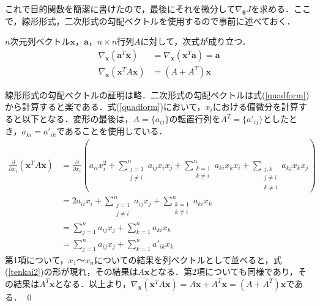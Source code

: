 これで目的関数を簡潔に書けたので，最後にそれを微分して$\nabla_{{\bm \theta}}J$を求める．ここで，線形形式，二次形式の勾配ベクトルを使用するので事前に述べておく．
\begin{theo}
$n$次元列ベクトル${\bm x}，{\bm a}$，$n\times n$行列$A$に対して，次式が成り立つ．
\begin{align}
\nabla_{{\bm x}}({\bm a}^T {\bm x})&=\nabla_{{\bm x}}({\bm x}^T {\bm a})={\bm a}\\
\nabla_{{\bm x}}({\bm x}^T A{\bm x})&=(A+A^T){\bm x}
\end{align}
\end{theo}
\begin{pro}
線形形式の勾配ベクトルの証明は略．二次形式の勾配ベクトルは式(\ref{quadform})から計算すると楽である．式(\ref{quadform})において，$x_i$における偏微分を計算すると以下となる．変形の最後は，$A=\{a_{ij}\}$の転置行列を$A^T=\{a'_{ij}\}$としたとき，$a_{ki}=a'_{ik}$であることを使用している．
\begin{align*}
\frac{\partial }{\partial x_i}({\bm x}^T A{\bm x})&=\frac{\partial }{\partial x_i}\left(a_{ii}x_i^2+\sum_{\substack{j=1\\j\neq i}}^n a_{ij}x_ix_j+\sum_{\substack{k=1\\k\neq i}}^n a_{ki}x_kx_i+\sum_{\substack{j,k\\j\neq i\\k\neq i}}a_{kj}x_kx_j\right) 	\\
&=2a_{ii}x_i+\sum_{\substack{j=1\\j\neq i}}^n a_{ij}x_j+\sum_{\substack{k=1\\k\neq i}}^n a_{ki}x_k\\
&=\sum_{j=1}^na_{ij}x_j+\sum_{k=1}^na_{ki}x_k\\
&=\sum_{j=1}^na_{ij}x_j+\sum_{k=1}^na'_{ik}x_k
\end{align*}
第1項について，$x_1〜x_n$についての結果を列ベクトルとして並べると，式(\ref{tenkai2})の形が現れ，その結果は$A{\bm x}$となる．第2項についても同様であり，その結果は$A^T{\bm x}$となる．以上より，$\nabla_{{\bm x}}({\bm x}^T A{\bm x})=A{\bm x}+A^T{\bm x}=(A+A^T){\bm x}$である．
\qed	
\end{pro}

